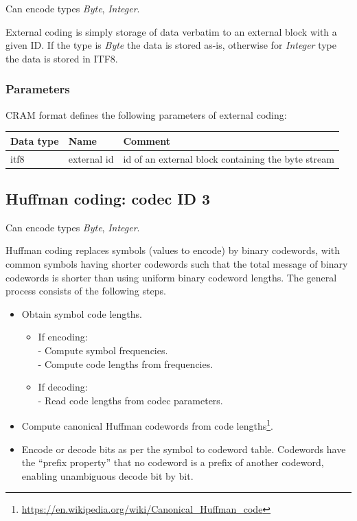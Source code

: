 \documentclass[a4paper]{article}
\begin{document}
Can encode types \textit{Byte}, \textit{Integer}.

External coding is simply storage of data verbatim to an external block with a given ID.
If the type is \textit{Byte} the data is stored as-is, otherwise for \textit{Integer} type the data is stored in ITF8.

\subsubsection*{Parameters}

CRAM format defines the following parameters of external coding: 

\begin{tabular}{|>{\raggedright}p{100pt}|>{\raggedright}p{100pt}|>{\raggedright}p{230pt}|}
\hline
\textbf{Data type} & \textbf{Name} & \textbf{Comment}
\tabularnewline
\hline
itf8 & external id & id of an external block containing the byte stream\tabularnewline
\hline
\end{tabular}

\subsection{Huffman coding: codec ID 3}

Can encode types \textit{Byte}, \textit{Integer}.

Huffman coding replaces symbols (values to encode) by binary codewords, with common symbols having shorter codewords such that the total message of binary codewords is shorter than using uniform binary codeword lengths.
The general process consists of the following steps.

\begin{itemize}
\item Obtain symbol code lengths.
\begin{itemize}
\item If encoding:\\
- Compute symbol frequencies.\\
- Compute code lengths from frequencies.
\item If decoding:\\
- Read code lengths from codec parameters.
\end{itemize}

\item Compute canonical Huffman codewords from code lengths\footnote{\url{https://en.wikipedia.org/wiki/Canonical_Huffman_code}}.

\item Encode or decode bits as per the symbol to codeword table.
Codewords have the ``prefix property'' that no codeword is a prefix of another codeword, enabling unambiguous decode bit by bit.
\end{itemize}
\end{document}
